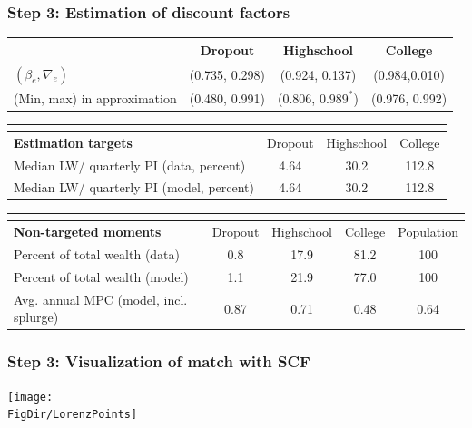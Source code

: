 \documentclass[pdflatex,aspectratio=169, handout]{beamer}
\begin{document}
{        \begin{frame}
          \frametitle{Step 3: Estimation of discount factors}
          \begin{tabular}{lccc}
            & Dropout & Highschool & College \\ \midrule
            $(\beta_e, \nabla_e)$ & (0.735, 0.298) & (0.924, 0.137) & (0.984,0.010) \\
            (Min, max) in approximation & (0.480, 0.991) & (0.806, $0.989^*$) & (0.976, 0.992) \\
            \midrule 
          \end{tabular} 
          \begin{tabular}{lccc}
            \multicolumn{4}{l}{ } \\ \midrule
            \textbf{Estimation targets} & Dropout & Highschool & College \\ \midrule
            Median LW/ quarterly PI (data, percent) & 4.64 & 30.2 & 112.8 \\ 
            Median LW/ quarterly PI (model, percent) & 4.64 & 30.2 & 112.8 %
            \\ \midrule 
          \end{tabular} 
          \begin{tabular}{lcccc}
            \multicolumn{5}{l}{ } \\ \midrule
            \textbf{Non-targeted moments} & Dropout & Highschool & College & Population \\ \midrule
            Percent of total wealth (data) & 0.8 & 17.9 & 81.2 & 100 \\
            Percent of total wealth (model) & 1.1 & 21.9 & 77.0 & 100 \\
            Avg. annual MPC (model, incl. splurge) & 0.87 & 0.71 & 0.48 & 0.64
            \\ \bottomrule 
          \end{tabular}
        \end{frame}




        \begin{frame}
          \frametitle{Step 3: Visualization of match with SCF}
          \centering
          \texttt{[image: \\FigDir/LorenzPoints]}
        \end{frame}


      }{}
\end{document}
